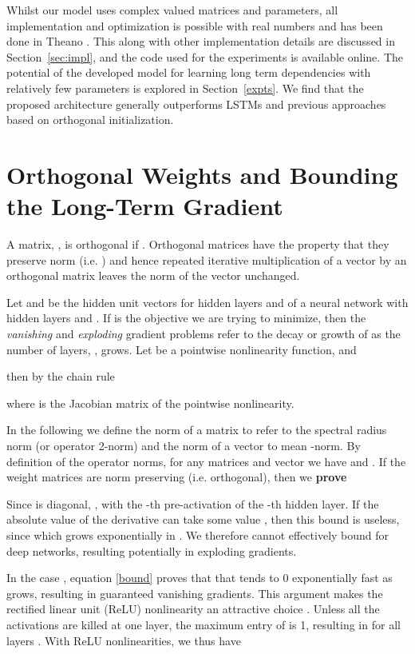 \documentclass{article}
\begin{document}
Whilst our model uses complex valued matrices and parameters, all
implementation and optimization is possible with real numbers and has been
done in Theano \citep{Fred2010}. This along with other implementation details are discussed
in Section~\ref{sec:impl}, and the code used for the experiments is available online.
The potential of the developed model for learning long term dependencies
with relatively few parameters is explored in Section~\ref{expts}. 
We find that the proposed architecture generally outperforms LSTMs and previous
approaches based on orthogonal initialization.

\section{Orthogonal Weights and Bounding the Long-Term Gradient}
\label{sec:ortho}

A matrix, , is orthogonal if 
. 
Orthogonal matrices have the property that they preserve norm (i.e. )
and hence repeated iterative multiplication of a vector by an orthogonal matrix leaves the norm of the 
vector unchanged.

Let  and  be the hidden unit vectors for hidden layers  and  of a neural network with 
 hidden layers and . 
If  is the objective we are trying to minimize, then the {\it{vanishing}} and {\it{exploding}} 
gradient problems refer to the decay or growth of  as the 
number of layers, , grows. Let  be a pointwise nonlinearity function, and

then by the chain rule

where  is the Jacobian matrix of the pointwise nonlinearity.

In the following we define the norm of a matrix to refer to the spectral radius norm (or operator 2-norm)
and the norm of a vector to mean -norm. By definition of the operator norms, 
for any matrices  and vector  we have  and .
If the weight matrices  are norm preserving (i.e. orthogonal), then we {\bf{prove}}


Since  is diagonal, ,
with  the -th pre-activation of the -th hidden layer.
If the absolute value of the derivative  can take some value , then 
this bound is useless, since  which grows exponentially 
in . We therefore cannot effectively bound  
for deep networks, resulting potentially in exploding gradients.

In the case , equation \ref{bound} proves that 
that  tends to 0 exponentially fast as  grows, 
resulting in guaranteed vanishing gradients. 
This argument makes the rectified linear unit (ReLU) nonlinearity an attractive choice
\citep{Glorot2011, Nair2010}. Unless all the activations are killed at one layer, 
the maximum entry of  is 1, resulting in
 for all layers . With ReLU nonlinearities, we thus have
\end{document}
